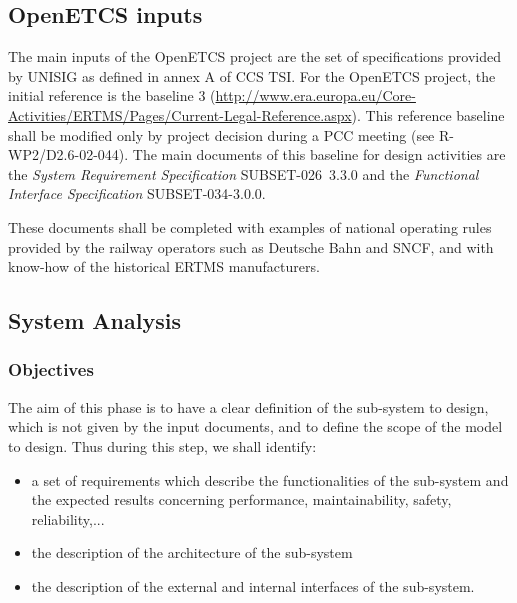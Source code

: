
\subsection{OpenETCS inputs}
\label{sec:inputs}


The main inputs of the OpenETCS project are the set of specifications provided by UNISIG as defined in annex A of CCS TSI. For the OpenETCS project, the initial reference is the baseline 3 (\url{http://www.era.europa.eu/Core-Activities/ERTMS/Pages/Current-Legal-Reference.aspx}). This reference baseline shall be modified only by project decision during a PCC meeting (see R-WP2/D2.6-02-044).
The main documents of this baseline for design activities are the \emph{System Requirement Specification} SUBSET-026~3.3.0 and the \textit{Functional Interface Specification} SUBSET-034-3.0.0.

These documents shall be completed with examples of national operating rules
provided by the railway operators such as Deutsche Bahn and SNCF, and with
know-how of the historical ERTMS manufacturers.




\subsection{System Analysis}
\label{sec:sys-analysis}


\subsubsection{Objectives}
\label{sec:sys-ana-objective}

The aim of this phase is to have a clear definition of the sub-system to design, which is not given by the input documents, and to define the scope of the model to design. Thus during this step, we shall identify:

\begin{itemize}
\item a set of requirements which describe the functionalities of the sub-system and the expected results concerning performance, maintainability, safety, reliability,...
\item the description of the architecture of the sub-system
\item the description of the external and internal interfaces of the sub-system.
\end{itemize}


